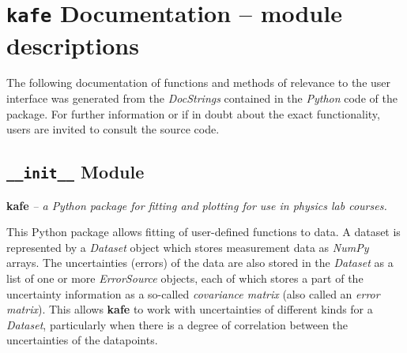 \documentclass[a4paper,10pt,english]{sphinxmanual}
\begin{document}
\chapter{\texttt{kafe} Documentation -- module descriptions}
\label{index:kafe-documentation-module-descriptions}
The following documentation of functions and methods
of relevance to the user interface was generated from
the \emph{DocStrings} contained in the \emph{Python} code of the
 package.
For further information or if in doubt about the exact
functionality, users are invited to consult the source
code.


\section{\texttt{\_\_init\_\_} Module}
\label{index:init-module}\label{index:module-kafe.__init__}
\textbf{kafe} \emph{-- a Python package for fitting and plotting for use in physics lab
courses.}

This Python package allows fitting of user-defined functions to data. A dataset
is represented by a \emph{Dataset} object which stores measurement data as \emph{NumPy}
arrays. The uncertainties (errors) of the data are also stored in the \emph{Dataset}
as a list of one or more \emph{ErrorSource} objects, each of which stores a part of
the uncertainty information as a so-called \emph{covariance matrix} (also called an
\emph{error matrix}). This allows \textbf{kafe} to work with uncertainties of different
kinds for a \emph{Dataset}, particularly when there is a degree of correlation
between the uncertainties of the datapoints.
\end{document}
